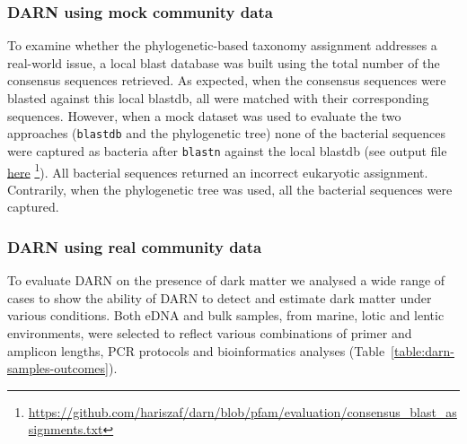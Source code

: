    \newpage

   \subsubsection{DARN using mock community data}

   To examine whether the phylogenetic-based taxonomy assignment addresses a real-world issue, a local blast database was built using the total number of the consensus sequences retrieved. 
   As expected, when the consensus sequences were blasted against this local blastdb, all were matched with their corresponding sequences. 
   However, when a mock dataset was used to evaluate the two approaches (\texttt{blastdb} and the phylogenetic tree) none of the bacterial sequences were captured as bacteria after \texttt{blastn} against the local blastdb (see output file \href{https://github.com/hariszaf/darn/blob/pfam/evaluation/consensus_blast_assignments.txt}{here} 
   \footnote{
      \href{https://github.com/hariszaf/darn/blob/pfam/evaluation/consensus_blast_assignments.txt}{https://github.com/hariszaf/darn/blob/pfam/evaluation/consensus\_blast\_assignments.txt}
   }). 
   All bacterial sequences returned an incorrect eukaryotic assignment. 
   Contrarily, when the phylogenetic tree was used, all the bacterial sequences were captured.


   \subsubsection{DARN using real community data}

   To evaluate DARN on the presence of dark matter we analysed a wide range of cases to show the ability of DARN to detect and estimate dark matter under various conditions. 
   Both eDNA and bulk samples, from marine, lotic and lentic environments, were selected to reflect various combinations of primer and amplicon lengths, PCR protocols and bioinformatics analyses (Table~\ref{table:darn-samples-outcomes}).

